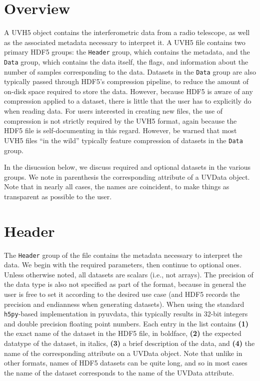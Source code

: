 \documentclass[11pt, oneside]{article}
\begin{document}
\section{Overview}
\label{sec:overview}
A UVH5 object contains the interferometric data from a radio telescope, as well
as the associated metadata necessary to interpret it. A UVH5 file contains two
primary HDF5 groups: the \verb+Header+ group, which contains the metadata, and
the \verb+Data+ group, which contains the data itself, the flags, and
information about the number of samples corresponding to the data. Datasets in
the \verb+Data+ group are also typically passed through HDF5's compression
pipeline, to reduce the amount of on-disk space required to store the data.
However, because HDF5 is aware of any compression applied to a dataset, there is
little that the user has to explicitly do when reading data. For users
interested in creating new files, the use of compression is not strictly
required by the UVH5 format, again because the HDF5 file is self-documenting in
this regard. However, be warned that most UVH5 files ``in the wild'' typically
feature compression of datasets in the \verb+Data+ group.

In the disucssion below, we discuss required and optional datasets in the
various groups. We note in parenthesis the corresponding attribute of a UVData
object. Note that in nearly all cases, the names are coincident, to make things
as transparent as possible to the user.

\section{Header}
\label{sec:header}
The \verb+Header+ group of the file contains the metadata necessary to interpret
the data. We begin with the required parameters, then continue to optional
ones. Unless otherwise noted, all datasets are scalars (i.e., not arrays). The
precision of the data type is also not specified as part of the format, because
in general the user is free to set it according to the desired use case (and
HDF5 records the precision and endianness when generating datasets). When using
the standard \verb+h5py+-based implementation in pyuvdata, this typically
results in 32-bit integers and double precision floating point numbers. Each
entry in the list contains \textbf{(1)} the exact name of the dataset in the
HDF5 file, in boldface, \textbf{(2)} the expected datatype of the dataset, in
italics, \textbf{(3)} a brief description of the data, and \textbf{(4)} the name
of the corresponding attribute on a UVData object. Note that unlike in other
formats, names of HDF5 datasets can be quite long, and so in most cases the name
of the dataset corresponds to the name of the UVData attribute.
\end{document}
